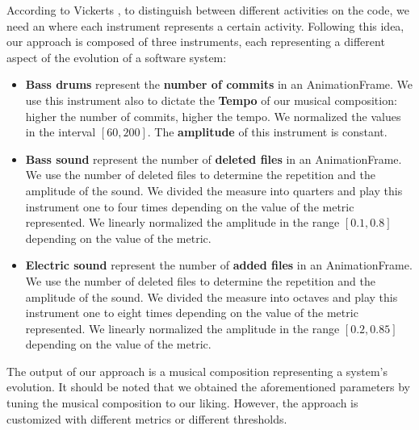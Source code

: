 According to Vickerts \cite{Vickers2004}, to distinguish between different activities on the code, we need an \emph{} where each instrument represents a certain activity. Following this idea, our approach is composed of three instruments, each representing a different aspect of the evolution of a software system:

\begin{itemize}

    \item \textbf{Bass drums} represent the \textbf{number of commits} in an AnimationFrame. We use this instrument also to dictate the \textbf{Tempo} of our musical composition: higher the number of commits, higher the tempo. We normalized the values in the interval $\left[60,200\right]$. The \textbf{amplitude} of this instrument is constant.
    
    \item \textbf{Bass sound} represent the number of \textbf{deleted files} in an AnimationFrame. We use the number of deleted files to determine the repetition and the amplitude of the sound. We divided the measure into quarters and play this instrument one to four times depending on the value of the metric represented. We linearly normalized the amplitude in the range $\left[0.1,0.8\right]$ depending on the value of the metric.
    
    \item \textbf{Electric sound} represent the number of \textbf{added files} in an AnimationFrame. We use the number of deleted files to determine the repetition and the amplitude of the sound. We divided the measure into octaves and play this instrument one to eight times depending on the value of the metric represented. We linearly normalized the amplitude in the range $\left[0.2,0.85\right]$ depending on the value of the metric.

\end{itemize}

The output of our approach is a musical composition representing a system's evolution. It should be noted that we obtained the aforementioned parameters by tuning the musical composition to our liking. However, the approach is customized with different metrics or different thresholds. 

